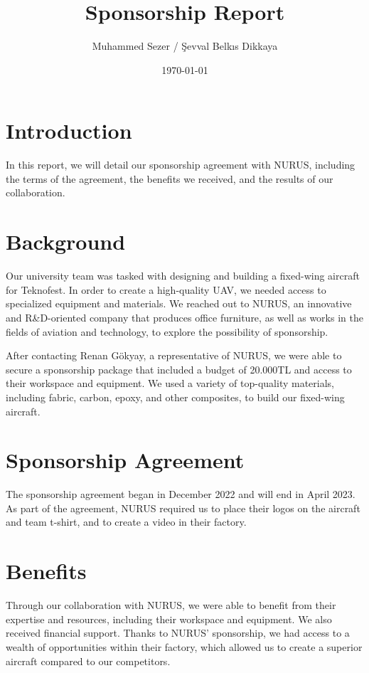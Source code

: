 \documentclass{article}
\title{Sponsorship Report}
\author{Muhammed Sezer / Şevval Belkıs Dikkaya}
\date{\today}
\begin{document}
\maketitle

\section{Introduction}

In this report, we will detail our sponsorship agreement with NURUS, including the terms of the agreement, the benefits we received, and the results of our collaboration.

\section{Background}

Our university team was tasked with designing and building a fixed-wing aircraft for Teknofest. In order to create a high-quality UAV, we needed access to specialized equipment and materials. We reached out to NURUS, an innovative and R\&D-oriented company that produces office furniture, as well as works in the fields of aviation and technology, to explore the possibility of sponsorship.

After contacting Renan Gökyay, a representative of NURUS, we were able to secure a sponsorship package that included a budget of 20.000TL and access to their workspace and equipment. We used a variety of top-quality materials, including fabric, carbon, epoxy, and other composites, to build our fixed-wing aircraft.

\section{Sponsorship Agreement}

The sponsorship agreement began in December 2022 and will end in April 2023. As part of the agreement, NURUS required us to place their logos on the aircraft and team t-shirt, and to create a video in their factory.

\section{Benefits}

Through our collaboration with NURUS, we were able to benefit from their expertise and resources, including their workspace and equipment. We also received financial support.
Thanks to NURUS' sponsorship, we had access to a wealth of opportunities within their factory, which allowed us to create a superior aircraft compared to our competitors.
\end{document}
